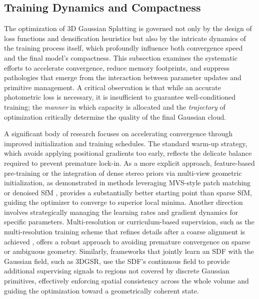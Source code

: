 \documentclass[11pt,a4paper]{article}
\begin{document}
\subsection{Training Dynamics and Compactness}


The optimization of 3D Gaussian Splatting is governed not only by the design of loss functions and densification heuristics but also by the intricate dynamics of the training process itself, which profoundly influence both convergence speed and the final model's compactness. This subsection examines the systematic efforts to accelerate convergence, reduce memory footprints, and suppress pathologies that emerge from the interaction between parameter updates and primitive management. A critical observation is that while an accurate photometric loss is necessary, it is insufficient to guarantee well-conditioned training; the \emph{manner} in which capacity is allocated and the \emph{trajectory} of optimization critically determine the quality of the final Gaussian cloud.

A significant body of research focuses on accelerating convergence through improved initialization and training schedules. The standard warm-up strategy, which avoids applying positional gradients too early, reflects the delicate balance required to prevent premature lock-in. As a more explicit approach, feature-based pre-training or the integration of dense stereo priors via multi-view geometric initialization, as demonstrated in methods leveraging MVS-style patch matching \cite{arxiv:2411.19454v2} or denoised SfM \cite{arxiv:2605.00569v1}, provides a substantially better starting point than sparse SfM, guiding the optimizer to converge to superior local minima. Another direction involves strategically managing the learning rates and gradient dynamics for specific parameters. Multi-resolution or curriculum-based supervision, such as the multi-resolution training scheme that refines details after a coarse alignment is achieved \cite{arxiv:2411.16898v4}, offers a robust approach to avoiding premature convergence on sparse or ambiguous geometry. Similarly, frameworks that jointly learn an SDF with the Gaussian field, such as 3DGSR, use the SDF's continuous field to provide additional supervising signals to regions not covered by discrete Gaussian primitives, effectively enforcing spatial consistency across the whole volume and guiding the optimization toward a geometrically coherent state.
\end{document}

